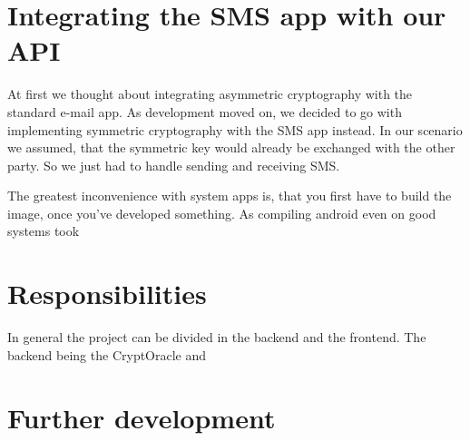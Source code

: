 \documentclass[a4paper,draft]{scrartcl}
\begin{document}

\section{Integrating the SMS app with our API}
	\label{sec-sms-app}
	At first we thought about integrating asymmetric cryptography with the standard e-mail app. As development moved on, we decided to go with implementing symmetric cryptography with the SMS app instead. %
	In our scenario we assumed, that the symmetric key would already be exchanged with the other party. So we just had to handle sending and receiving SMS.
	
	The greatest inconvenience with system apps is, that you first have to build the image, once you've developed something. As compiling android even on good systems took
	
\section{Responsibilities}
	In general the project can be divided in the backend and the frontend. The backend being the CryptOracle and 
	
\section{Further development}
\end{document}
